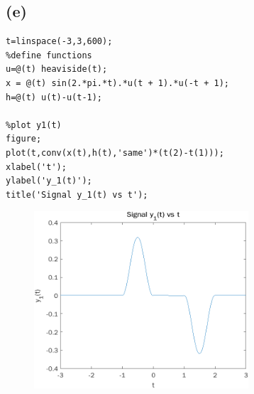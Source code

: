 \documentclass[12pt]{article}
\begin{document}
\subsection*{(e)}
\begin{lstlisting}
t=linspace(-3,3,600);
%define functions
u=@(t) heaviside(t);
x = @(t) sin(2.*pi.*t).*u(t + 1).*u(-t + 1);
h=@(t) u(t)-u(t-1);

%plot y1(t)
figure;
plot(t,conv(x(t),h(t),'same')*(t(2)-t(1)));
xlabel('t');
ylabel('y_1(t)');
title('Signal y_1(t) vs t');
\end{lstlisting}
\begin{figure}[h]\includegraphics[width=8cm]{4e}
\end{figure}
\end{document}
